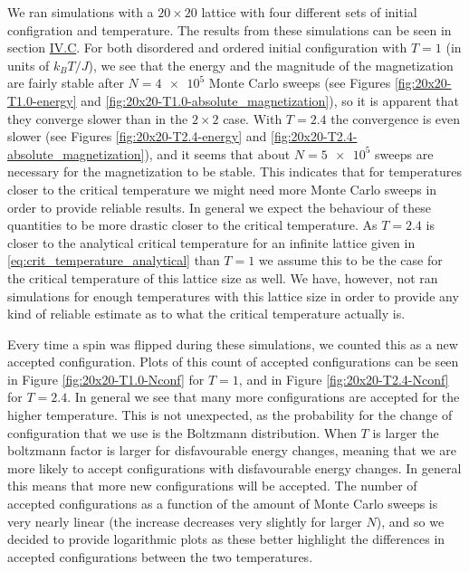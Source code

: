 \documentclass[reprint,english,notitlepage]{revtex4-1}  %
\begin{document}
We ran simulations with a $20 \times 20$ lattice with four different sets of initial configration and temperature. The results from these simulations can be seen in section \hyperref[sec:IV:C]{IV.C}. For both disordered and ordered initial configuration with $T=1$ (in units of $k_B T/J$), we see that the energy and the magnitude of the magnetization are fairly stable after $N=\num{4e5}$ Monte Carlo sweeps (see Figures \ref{fig:20x20-T1.0-energy} and \ref{fig:20x20-T1.0-absolute_magnetization}), so it is apparent that they converge slower than in the $2 \times 2$ case. With $T=2.4$ the convergence is even slower (see Figures \ref{fig:20x20-T2.4-energy} and \ref{fig:20x20-T2.4-absolute_magnetization}), and it seems that about $N=\num{5e5}$ sweeps are necessary for the magnetization to be stable. This indicates that for temperatures closer to the critical temperature we might need more Monte Carlo sweeps in order to provide reliable results. In general we expect the behaviour of these quantities to be more drastic closer to the critical temperature. As $T=2.4$ is closer to the analytical critical temperature for an infinite lattice given in \eqref{eq:crit_temperature_analytical} than $T=1$ we assume this to be the case for the critical temperature of this lattice size as well. We have, however, not ran simulations for enough temperatures with this lattice size in order to provide any kind of reliable estimate as to what the critical temperature actually is. 

Every time a spin was flipped during these simulations, we counted this as a new accepted configuration. Plots of this count of accepted configurations can be seen in Figure \ref{fig:20x20-T1.0-Nconf} for $T=1$, and in Figure \ref{fig:20x20-T2.4-Nconf} for $T=2.4$. In general we see that many more configurations are accepted for the higher temperature. This is not unexpected, as the probability for the change of configuration that we use is the Boltzmann distribution. When $T$ is larger the boltzmann factor is larger for disfavourable energy changes, meaning that we are more likely to accept configurations with disfavourable energy changes. In general this means that more new configurations will be accepted. The number of accepted configurations as a function of the amount of Monte Carlo sweeps is very nearly linear (the increase decreases very slightly for larger $N$), and so we decided to provide logarithmic plots as these better highlight the differences in accepted configurations between the two temperatures. 
\end{document}
